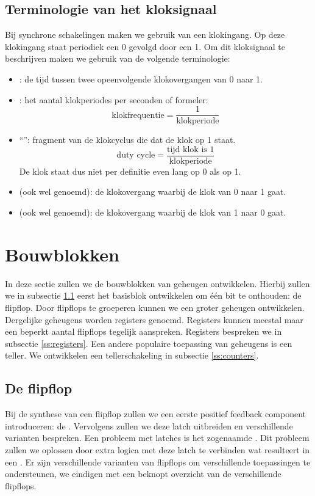 \subsection{Terminologie van het kloksignaal}
Bij synchrone schakelingen maken we gebruik van een klokingang. Op deze klokingang staat periodiek een 0 gevolgd door een 1. Om dit kloksignaal te beschrijven maken we gebruik van de volgende terminologie:
\begin{itemize}
 \item {}: de tijd tussen twee opeenvolgende klokovergangen van 0 naar 1.
 \item {}: het aantal klokperiodes per seconden of formeler:
\begin{equation}
\mbox{klokfrequentie}=\displaystyle\frac{1}{\mbox{klokperiode}}
\end{equation}
 \item ``'': fragment van de klokcyclus die dat de klok op 1 staat.
\begin{equation}
\mbox{duty cycle}=\displaystyle\frac{\mbox{tijd klok is 1}}{\mbox{klokperiode}}
\end{equation}
De klok staat dus niet per definitie even lang op 0 als op 1.
 \item {} (ook wel  genoemd): de klokovergang waarbij de klok van 0 naar 1 gaat.
 \item {} (ook wel  genoemd): de klokovergang waarbij de klok van 1 naar 0 gaat.
\end{itemize}
\section{Bouwblokken}
\label{s:memoryBlocks}
In deze sectie zullen we de bouwblokken van geheugen ontwikkelen. Hierbij zullen we in subsectie \ref{ss:flipflop} eerst het basisblok ontwikkelen om \'e\'en bit te onthouden: de flipflop. Door flipflops te groeperen kunnen we een groter geheugen ontwikkelen. Dergelijke geheugens worden registers genoemd. Registers kunnen meestal maar een beperkt aantal flipflops tegelijk aanspreken. Registers bespreken we in subsectie \ref{ss:registers}. Een andere populaire toepassing van geheugens is een teller. We ontwikkelen een tellerschakeling in subsectie \ref{ss:counters}.
\subsection{De flipflop}
\label{ss:flipflop}
Bij de synthese van een flipflop zullen we een eerste positief feedback component introduceren: de . Vervolgens zullen we deze latch uitbreiden en verschillende varianten bespreken. Een probleem met latches is het zogenaamde . Dit probleem zullen we oplossen door extra logica met deze latch te verbinden wat resulteert in een . Er zijn verschillende varianten van flipflops om verschillende toepassingen te ondersteunen, we eindigen met een beknopt overzicht van de verschillende flipflops.
